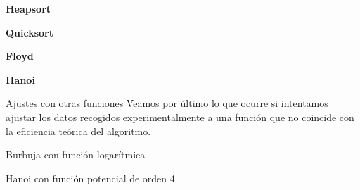 \documentclass[spanish]{beamer}
\begin{document}
\begin{frame}
    \vspace{2.5em}
    \textbf{Heapsort}
	\fontsize{5.8pt}{7.2}\selectfont
	\begin{center}
		
	\end{center}
\end{frame}

\begin{frame}
    \vspace{2.5em}
    \textbf{Quicksort}
	\fontsize{5.8pt}{7.2}\selectfont
	\begin{center}
		
	\end{center}
\end{frame}

\begin{frame}
    \vspace{2.5em}
    \textbf{Floyd}
	\fontsize{7pt}{7.2}\selectfont
	\begin{center}
		
	\end{center}
\end{frame}

\begin{frame}
    \vspace{2.5em}
    \textbf{Hanoi}
	\fontsize{8pt}{7.2}\selectfont
	\begin{center}
		
	\end{center}
\end{frame}

\begin{frame}{Ajustes con otras funciones}
	Veamos por último lo que ocurre si intentamos ajustar los datos recogidos experimentalmente a una función que no coincide con la eficiencia teórica del algoritmo.
\end{frame}

\begin{frame}{Burbuja con función logarítmica}
	\fontsize{8pt}{7.2}\selectfont
	\begin{center}
		
	\end{center}
\end{frame}

\begin{frame}{Hanoi con función potencial de orden 4}
	\fontsize{8pt}{7.2}\selectfont
	\begin{center}
		
	\end{center}
\end{frame}
\end{document}
